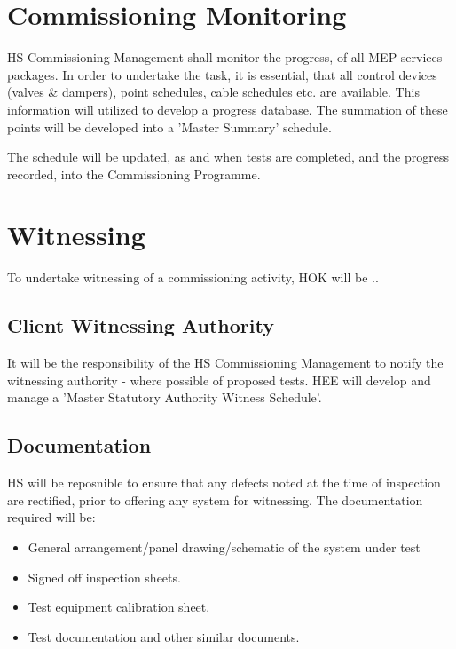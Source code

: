 \section{Commissioning Monitoring}

HS Commissioning Management shall monitor the progress, of all MEP services packages. In order to undertake the task, it is essential, that all control devices (valves \& dampers), point schedules, cable schedules etc. are available. This information will utilized to develop a progress database. The summation of these points will be developed into a 'Master Summary' schedule.

The schedule will be updated, as and when tests are completed, and the progress recorded, into the Commissioning Programme.

\section{Witnessing}

To undertake witnessing of a commissioning activity, HOK will be ..

\subsection*{Client Witnessing Authority}

It will be the responsibility of the HS Commissioning Management to notify the witnessing authority - where possible of proposed tests. HEE will develop and manage a 'Master Statutory Authority Witness Schedule'.

\subsection*{Documentation}

HS will be reposnible to ensure that any defects noted at the time of inspection are rectified, prior to offering any system for witnessing. The documentation required will be:

\begin{itemize}
\item General arrangement/panel drawing/schematic of the system under test
\item Signed off inspection sheets.
\item Test equipment calibration sheet.
\item Test documentation and other similar documents.
\end{itemize}


